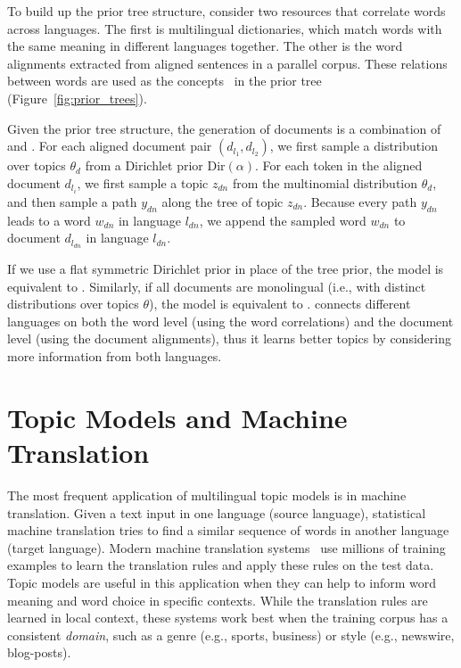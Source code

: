 To build up the prior tree structure, \citet{hu-14} consider two
resources that correlate words across languages. The first is
multilingual dictionaries, which match words with the same meaning in
different languages together. The other is the word alignments
extracted from aligned sentences in a parallel corpus. These relations
between words are used as the concepts~\citep{Bhattacharya-2006} in
the prior tree (Figure~\ref{fig:prior_trees}).

Given the prior tree structure, the generation of documents is a
combination of \tlda{} and \plda{}.  For each aligned document pair
$(d_{l_1}, d_{l_2})$, we first sample a distribution over topics
$\theta_d$ from a Dirichlet prior $\text{Dir}(\alpha)$.  For each
token in the aligned document $d_{l_i}$, we first sample a topic
$z_{dn}$ from the multinomial distribution $\theta_d$, and then sample
a path $y_{dn}$ along the tree of topic $z_{dn}$. Because every path
$y_{dn}$ leads to a word $w_{dn}$ in language $l_{dn}$, we append the
sampled word $w_{dn}$ to document $d_{l_{dn}}$ in language $l_{dn}$.

If we use a flat symmetric Dirichlet prior in place of the tree prior,
the model is equivalent to \plda{}. Similarly, if all documents are monolingual (i.e., with
distinct distributions over topics $\theta$), the model is equivalent to \tlda{}. \ptlda{} connects different languages on both the word
level (using the word correlations) and the document level (using the
document alignments), thus it learns better topics by considering more
information from both languages.


\section{Topic Models and Machine Translation}
\label{sec:tm-mt}

The most frequent application of multilingual topic models is in machine translation.
Given a text input in one language (source language), statistical
machine translation tries to find a similar sequence of words in another
language (target language). Modern machine translation
systems~\citep{koehn-09} use millions of training examples to learn
the translation rules and apply these rules on the test data. 
Topic models are useful in this application when they can help to inform word meaning and word choice in specific contexts.
While the translation rules are learned in local context, these systems work
best when the training corpus has a consistent \emph{domain}, such as a
 genre (e.g., sports, business) or style (e.g.,
newswire, blog-posts). 

